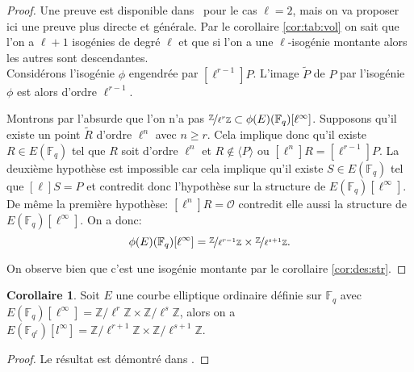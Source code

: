 \documentclass[10pt,a4paper]{book}
\theoremstyle{plain}
\theoremstyle{definition}
\theoremstyle{definition}
\newtheorem{cor}[thm]{Corollaire}
\theoremstyle{definition}
\theoremstyle{definition}
\theoremstyle{remark}
\theoremstyle{remark}
\theoremstyle{definition}
\begin{document}
\begin{proof}
Une preuve est disponible dans~\cite[Proposition 4]{MiretMSTV08} pour le cas $\ell=2$, mais on va proposer ici une preuve plus directe et générale.
Par le corollaire \ref{cor:tab:vol} on sait que l'on a $\ell+1$ isogénies de degré $\ell$ et que si l'on a une $\ell$-isogénie montante alors les autres sont descendantes.
\\
Considérons l'isogénie $\phi$ engendrée par $[\ell^{r-1}]P$. L'image $\widetilde{P}$ de $P$ par l'isogénie $\phi$ est alors d'ordre $\ell^{r-1}$. 

Montrons par l'absurde que l'on n'a pas $\nicefrac{\mathbb{Z}}{\ell^{r}\mathbb{Z}} \subset \phi(E)(\mathbb{F}_q)[\ell^{\infty}]$. Supposons qu'il existe un point $\widetilde{R}$ d'ordre $\ell^n$ avec $n \geqslant r$. Cela implique donc qu'il existe $R \in E(\mathbb{F}_q)$ tel que $R$ soit d'ordre $\ell^n$ et $R \notin \langle P \rangle$ ou  $[\ell^n]R =[\ell^{r-1}]P$. La deuxième hypothèse est impossible car cela implique qu'il existe $S \in E(\mathbb{F}_q)$ tel que $[\ell] S=P$ et contredit donc l'hypothèse sur la structure de $E(\mathbb{F}_q)[\ell^{\infty}]$. De même la première hypothèse: $[\ell^n]R = \mathcal{O}$ contredit elle aussi la structure de $E(\mathbb{F}_q)[\ell^{\infty}]$. On a donc:
\[\phi(E)(\mathbb{F}_q)[\ell^{\infty}]=\nicefrac{\mathbb{Z}}{\ell^{r-1}\mathbb{Z}} \times \nicefrac{\mathbb{Z}}{\ell^{s+1}\mathbb{Z}}. \]

On observe bien que c'est une isogénie montante par le corollaire \ref{cor:des:str}.
\end{proof}

\begin{cor} 
\label{cor:struct:ext}
Soit $E$ une courbe elliptique ordinaire définie sur $\mathbb{F}_q$ avec $E(\mathbb{F}_{q})[\ell^{\infty}]=\mathbb{Z} / \ell^{r} \mathbb{Z} \times \mathbb{Z} / \ell^{s} \mathbb{Z}$, alors on a $E(\mathbb{F}_{q^{\ell}})[l^{\infty}]=\mathbb{Z} / \ell^{r+1} \mathbb{Z} \times \mathbb{Z} / \ell^{s+1} \mathbb{Z}$.
\end{cor}

\begin{proof}
Le résultat est démontré dans \cite[§5.3.1]{Ionica2010}.
\end{proof}
\end{document}
